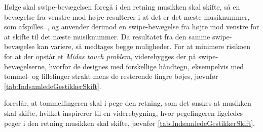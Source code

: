 Ifølge \textcite[s. 166]{PDF:ComparingInputModalities} skal swipe-bevægelsen foregå i den retning musikken skal skifte, så en bevægelse fra venstre mod højre resulterer i at det er det næste musiknummer, som afspilles. \textcite[s. 48]{PDF:UserDefinedGesturesTV}, \textcite{WEB:Beosound2} og \textcite{WEB:BeosoundMoment} anvender derimod en swipe-bevægelse fra højre mod venstre for at skifte til det næste musiknummer. Da resultatet fra den samme swipe-bevægelse kan variere, så medtages begge muligheder. For at minimere risikoen for at der opstår et \textit{Midas touch problem}, viderebygges der på swipe-bevægelserne, hvorfor de designes med forskellige håndtegn, eksempelvis med tommel- og lillefinger strakt mens de resterende fingre bøjes, jævnfør \autoref{tab:IndsamledeGestikkerSkift}.

\textcite[s. 166]{PDF:ComparingInputModalities} foreslår, at tommelfingeren skal i pege den retning, som det ønskes at musikken skal skifte, hvilket inspirerer til en viderebygning, hvor pegefingeren ligeledes peger i den retning musikken skal skifte, jævnfør \autoref{tab:IndsamledeGestikkerSkift}.            
%
